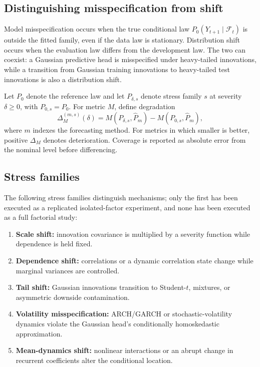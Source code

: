 \documentclass[11pt]{article}
\newcommand{\F}{\mathcal{F}}
\begin{document}
\subsection{Distinguishing misspecification from shift}

Model misspecification occurs when the true conditional law $P_0(Y_{t+1}\mid
\F_t)$ is outside the fitted family, even if the data law is stationary.
Distribution shift occurs when the evaluation law differs from the development
law. The two can coexist: a Gaussian predictive head is misspecified under
heavy-tailed innovations, while a transition from Gaussian training innovations
to heavy-tailed test innovations is also a distribution shift.

Let $P_0$ denote the reference law and let $P_{\delta,s}$ denote stress family $s$
at severity $\delta\geq0$, with $P_{0,s}=P_0$. For metric $M$, define degradation
\begin{equation}
\Delta_M^{(m,s)}(\delta)
=M(P_{\delta,s},\widehat P_m)-M(P_{0,s},\widehat P_m),
\label{eq:degradation}
\end{equation}
where $m$ indexes the forecasting method. For metrics in which smaller is better,
positive $\Delta_M$ denotes deterioration. Coverage is reported as absolute error
from the nominal level before differencing.

\subsection{Stress families}

The following stress families distinguish mechanisms; only the first has been
executed as a replicated isolated-factor experiment, and none has been executed
as a full factorial study:
\begin{enumerate}
    \item \textbf{Scale shift:} innovation covariance is multiplied by a severity
    function while dependence is held fixed.
    \item \textbf{Dependence shift:} correlations or a dynamic correlation state
    change while marginal variances are controlled.
    \item \textbf{Tail shift:} Gaussian innovations transition to Student-$t$,
    mixtures, or asymmetric downside contamination.
    \item \textbf{Volatility misspecification:} ARCH/GARCH or stochastic-volatility
    dynamics violate the Gaussian head's conditionally homoskedastic approximation.
    \item \textbf{Mean-dynamics shift:} nonlinear interactions or an abrupt change
    in recurrent coefficients alter the conditional location.
\end{enumerate}
\end{document}
